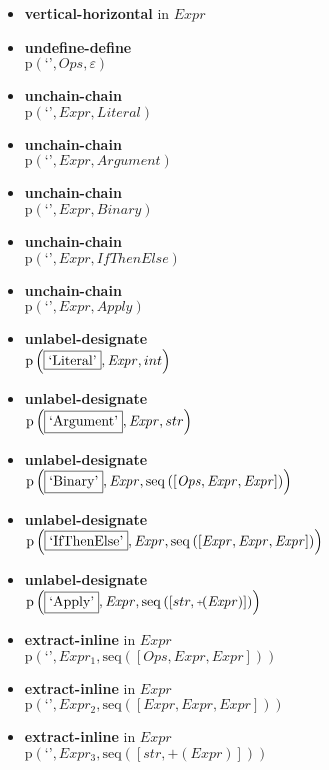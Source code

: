 {\begin{itemize}
\item \textbf{vertical-horizontal}  in $\mathit{Expr}$
\item \textbf{undefine-define}\\$\mathrm{p}\left(\text{`'},\mathit{Ops},\varepsilon\right)$
\item \textbf{unchain-chain}\\$\mathrm{p}\left(\text{`'},\mathit{Expr},\mathit{Literal}\right)$
\item \textbf{unchain-chain}\\$\mathrm{p}\left(\text{`'},\mathit{Expr},\mathit{Argument}\right)$
\item \textbf{unchain-chain}\\$\mathrm{p}\left(\text{`'},\mathit{Expr},\mathit{Binary}\right)$
\item \textbf{unchain-chain}\\$\mathrm{p}\left(\text{`'},\mathit{Expr},\mathit{IfThenElse}\right)$
\item \textbf{unchain-chain}\\$\mathrm{p}\left(\text{`'},\mathit{Expr},\mathit{Apply}\right)$
\item \textbf{unlabel-designate}\\$\mathrm{p}\left(\fbox{\text{`Literal'}},\mathit{Expr},int\right)$
\item \textbf{unlabel-designate}\\$\mathrm{p}\left(\fbox{\text{`Argument'}},\mathit{Expr},str\right)$
\item \textbf{unlabel-designate}\\$\mathrm{p}\left(\fbox{\text{`Binary'}},\mathit{Expr},\mathrm{seq}\left(\left[\mathit{Ops}, \mathit{Expr}, \mathit{Expr}\right]\right)\right)$
\item \textbf{unlabel-designate}\\$\mathrm{p}\left(\fbox{\text{`IfThenElse'}},\mathit{Expr},\mathrm{seq}\left(\left[\mathit{Expr}, \mathit{Expr}, \mathit{Expr}\right]\right)\right)$
\item \textbf{unlabel-designate}\\$\mathrm{p}\left(\fbox{\text{`Apply'}},\mathit{Expr},\mathrm{seq}\left(\left[str, \plus \left(\mathit{Expr}\right)\right]\right)\right)$
\item \textbf{extract-inline}  in $\mathit{Expr}$\\$\mathrm{p}\left(\text{`'},\mathit{Expr_1},\mathrm{seq}\left(\left[\mathit{Ops}, \mathit{Expr}, \mathit{Expr}\right]\right)\right)$
\item \textbf{extract-inline}  in $\mathit{Expr}$\\$\mathrm{p}\left(\text{`'},\mathit{Expr_2},\mathrm{seq}\left(\left[\mathit{Expr}, \mathit{Expr}, \mathit{Expr}\right]\right)\right)$
\item \textbf{extract-inline}  in $\mathit{Expr}$\\$\mathrm{p}\left(\text{`'},\mathit{Expr_3},\mathrm{seq}\left(\left[str, \plus \left(\mathit{Expr}\right)\right]\right)\right)$
\end{itemize}}

